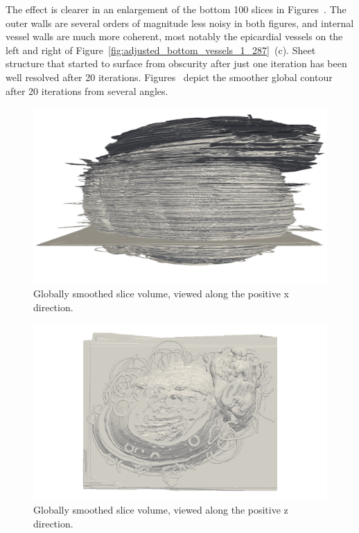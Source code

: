     The effect is clearer in an enlargement of the bottom 100 slices in Figures~. The outer walls are several orders of magnitude less noisy in both figures, and internal vessel walls are much more coherent, most notably the epicardial vessels on the left and right of Figure~\ref{fig:adjusted_bottom_vessels_1_287}~(c). Sheet structure that started to surface from obscurity after just one iteration has been well resolved after 20 iterations. Figures~ depict the smoother global contour after 20 iterations from several angles.
    
    \begin{figure}
      \centering
      \includegraphics[width=0.9\textheight]{Ch6/Figs/Rat28/contours/whole_positive_x_diffused}
      \caption{Globally smoothed slice volume, viewed along the positive x direction.}
      \label{fig:whole_positive_x_diffused}
    \end{figure}

    \begin{figure}
      \centering
      \includegraphics[width=0.9\textheight]{Ch6/Figs/Rat28/contours/whole_positive_z_diffused}
      \caption{Globally smoothed slice volume, viewed along the positive z direction.}
      \label{fig:whole_positive_z_diffused}
    \end{figure}
  
